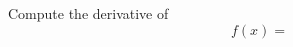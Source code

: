 \documentclass[12pt]{amsart}
\begin{document}
\begin{thm}[10 Points]
  Compute the derivative of
  \[f(x) = \]
\end{thm}

\begin{thm}[10 Points]
\end{thm}



\begin{thm}[10 Points]
\end{thm}

\begin{thm}[10 Points]
\end{thm}



\begin{thm}[10 Points]
\end{thm}

\begin{thm}[10 Points]
\end{thm}

\begin{thm}[10 Points]
\end{thm}

\begin{thm}[10 Points]
\end{thm}
\end{document}
